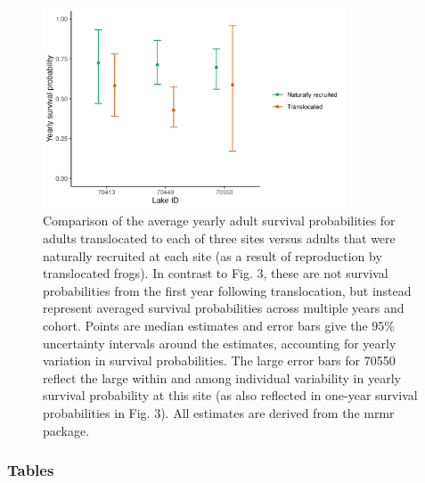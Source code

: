 \documentclass[9pt,twoside,lineno]{pnas-new}
\begin{document}
\begin{figure}

{\centering \includegraphics[width=0.8\textwidth]{figures/compare_surv_probs.jpg}

}

\caption{\label{fig-compare_surv_probs}Comparison of the average yearly
adult survival probabilities for adults translocated to each of three
sites versus adults that were naturally recruited at each site (as a
result of reproduction by translocated frogs). In contrast to
Fig. 3, these are not survival
probabilities from the first year following translocation, but instead
represent averaged survival probabilities across multiple years and
cohort. Points are median estimates and error bars give the 95\%
uncertainty intervals around the estimates, accounting for yearly
variation in survival probabilities. The large error bars for 70550
reflect the large within and among individual variability in yearly
survival probability at this site (as also reflected in one-year
survival probabilities in Fig. 3). All
estimates are derived from the mrmr package.}

\end{figure}\clearpage

\newpage

\hypertarget{tables}{%
\subsubsection{Tables}\label{tables}}

\hfill\break
\end{document}
